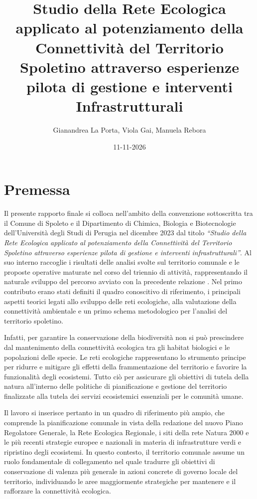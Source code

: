 \documentclass[
  a4paper,
]{book}
\title{Studio della Rete Ecologica applicato al potenziamento della Connettività del Territorio Spoletino attraverso esperienze pilota di gestione e interventi Infrastrutturali}
\author{Gianandrea La Porta, Viola Gai, Manuela Rebora}
\date{11-11-2026}
\begin{document}
\maketitle

{
\setcounter{tocdepth}{1}
\tableofcontents
}
\chapter{Premessa}\label{premessa}

Il presente rapporto finale si colloca nell'ambito della convenzione sottoscritta tra il Comune di Spoleto e il Dipartimento di Chimica, Biologia e Biotecnologie dell'Università degli Studi di Perugia nel dicembre 2023 dal titolo \emph{``Studio della Rete Ecologica applicato al potenziamento della Connettività del Territorio Spoletino attraverso esperienze pilota di gestione e interventi infrastrutturali''}.
Al suo interno raccoglie i risultati delle analisi svolte sul territorio comunale e le proposte operative maturate nel corso del triennio di attività, rappresentando il naturale sviluppo del percorso avviato con la precedente relazione \citep{laporta2025}.
Nel primo contributo erano stati definiti il quadro conoscitivo di riferimento, i principali aspetti teorici legati allo sviluppo delle reti ecologiche, alla valutazione della connettività ambientale e un primo schema metodologico per l'analisi del territorio spoletino.

Infatti, per garantire la conservazione della biodiversità non si può prescindere dal mantenimento della connettività ecologica tra gli habitat biologici e le popolazioni delle specie. Le reti ecologiche rappresentano lo strumento principe per ridurre e mitigare gli effetti della frammentazione del territorio e favorire la funzionalità degli ecosistemi. Tutto ciò per assicurare gli obiettivi di tutela della natura all'interno delle politiche di pianificazione e gestione del territorio finalizzate alla tutela dei servizi ecosistemici essenziali per le comunità umane.

Il lavoro si inserisce pertanto in un quadro di riferimento più ampio, che comprende la pianificazione comunale in vista della redazione del nuovo Piano Regolatore Generale, la Rete Ecologica Regionale, i siti della rete Natura 2000 e le più recenti strategie europee e nazionali in materia di infrastrutture verdi e ripristino degli ecosistemi.
In questo contesto, il territorio comunale assume un ruolo fondamentale di collegamento nel quale tradurre gli obiettivi di conservazione di valenza più generale in azioni concrete di governo locale del territorio, individuando le aree maggiormente strategiche per mantenere e il rafforzare la connettività ecologica.
\end{document}
